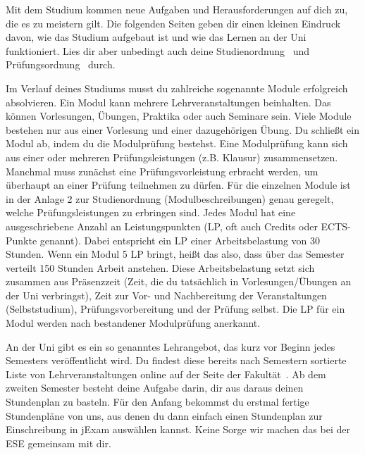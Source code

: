 
Mit dem Studium kommen neue Aufgaben und Herausforderungen auf dich zu, die es zu meistern gilt.
Die folgenden Seiten geben dir einen kleinen Eindruck davon, wie das Studium aufgebaut ist und wie das Lernen an der Uni funktioniert.
Lies dir aber unbedingt auch deine Studienordnung~
und Prüfungsordnung~ durch.

Im Verlauf deines Studiums musst du zahlreiche sogenannte Module erfolgreich absolvieren. Ein Modul kann mehrere Lehrveranstaltungen beinhalten. Das können Vorlesungen,
Übungen, Praktika oder auch Seminare sein. Viele Module bestehen nur aus einer Vorlesung und einer dazugehörigen Übung. Du schließt ein Modul ab, indem du die Modulprüfung
bestehst. Eine Modulprüfung kann sich aus einer oder mehreren Prüfungsleistungen (z.B. Klausur) zusammensetzen. Manchmal muss zunächst eine Prüfungsvorleistung erbracht werden, um
überhaupt an einer Prüfung teilnehmen zu dürfen. Für die einzelnen Module ist in der Anlage 2 zur Studienordnung (Modulbeschreibungen) genau geregelt, welche Prüfungsleistungen zu
erbringen sind.
Jedes Modul hat eine ausgeschriebene Anzahl an Leistungspunkten (LP, oft auch Credits oder ECTS-Punkte genannt). Dabei entspricht ein LP einer Arbeitsbelastung von 30 Stunden. Wenn ein Modul 5 LP bringt, heißt das also,
dass über das Semester verteilt 150 Stunden Arbeit anstehen. Diese Arbeitsbelastung setzt sich zusammen aus Präsenzzeit (Zeit, die du tatsächlich in Vorlesungen/Übungen an der Uni verbringst),
Zeit zur Vor- und Nachbereitung der Veranstaltungen (Selbststudium), Prüfungsvorbereitung und der Prüfung selbst. Die LP für ein Modul werden nach bestandener Modulprüfung anerkannt.


An der Uni gibt es ein so genanntes Lehrangebot, das kurz vor Beginn jedes Semesters veröffentlicht wird.
Du findest diese bereits nach Semestern sortierte Liste von Lehrveranstaltungen online auf der Seite der Fakultät~.
Ab dem zweiten Semester besteht deine Aufgabe darin, dir aus daraus deinen Stundenplan zu basteln.
Für den Anfang bekommst du erstmal fertige Stundenpläne von uns, aus denen du dann einfach einen Stundenplan zur Einschreibung in jExam auswählen kannst. Keine Sorge wir machen das bei der ESE gemeinsam mit dir.

